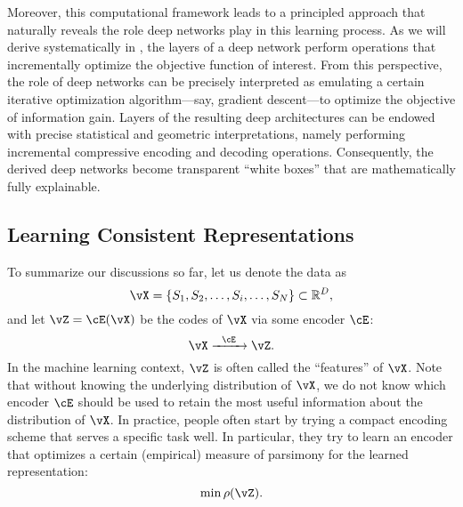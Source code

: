 \documentclass[../../book-main.tex]{subfiles}
\begin{document}
Moreover, this computational framework leads to a principled approach that naturally reveals the role deep networks play in this learning process. As we will derive systematically in , the layers of a deep network perform operations that incrementally optimize the objective function of interest. From this perspective, the role of deep networks can be precisely interpreted as emulating a certain iterative optimization algorithm---say, gradient descent---to optimize the objective of information gain. Layers of the resulting deep architectures can be endowed with precise statistical and geometric interpretations, namely performing incremental compressive encoding and decoding operations. Consequently, the derived deep networks become transparent ``white boxes'' that are mathematically fully explainable.



\subsection{Learning Consistent Representations}

\label{sec:consistency}

To summarize our discussions so far, let us denote the data as
\begin{equation}
    \vX = \{S_{1}, S_{2}, \ldots, S_{i}, \ldots, S_{N}\} \subset \R^{D},
\end{equation}
and let \(\vZ = \cE(\vX)\) be the codes of \(\vX\) via some encoder \(\cE\):
\begin{equation}
    \vX  \xrightarrow{\hspace{2mm} \cE\hspace{2mm}} \vZ.
    \label{eqn:open-loop}
\end{equation}
In the machine learning context, \(\vZ\) is often called the ``features'' of \(\vX\). Note that without knowing the underlying distribution of \(\vX\), we do not know which encoder \(\cE\) should be used to retain the most useful information about the distribution of \(\vX\). In practice, people often start by trying a compact encoding scheme that serves a specific task well. In particular, they try to learn an encoder that optimizes a certain (empirical) measure of parsimony for the learned representation:
\begin{equation}
    \min \rho(\vZ). 
\end{equation}
\end{document}
